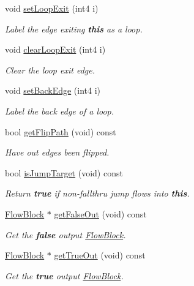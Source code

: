 \begin{DoxyCompactItemize}
void \mbox{\hyperlink{class_flow_block_a147b6b67590b45995925e08d6b77bd6e}{set\+Loop\+Exit}} (int4 i)
\begin{DoxyCompactList}\small\item\em Label the edge exiting {\bfseries{this}} as a loop. \end{DoxyCompactList}\item 
void \mbox{\hyperlink{class_flow_block_ac71babec977453975a79a1eda20babf2}{clear\+Loop\+Exit}} (int4 i)
\begin{DoxyCompactList}\small\item\em Clear the loop exit edge. \end{DoxyCompactList}\item 
void \mbox{\hyperlink{class_flow_block_a9a47416c1462a0fc5069afb8c7ed5b1c}{set\+Back\+Edge}} (int4 i)
\begin{DoxyCompactList}\small\item\em Label the {\itshape back} edge of a loop. \end{DoxyCompactList}\item 
bool \mbox{\hyperlink{class_flow_block_a7b9cd8f7c7ead109b98d92d56fab80a1}{get\+Flip\+Path}} (void) const
\begin{DoxyCompactList}\small\item\em Have out edges been flipped. \end{DoxyCompactList}\item 
bool \mbox{\hyperlink{class_flow_block_a9dd26ef25c281fc1c64a99ecd1c9eada}{is\+Jump\+Target}} (void) const
\begin{DoxyCompactList}\small\item\em Return {\bfseries{true}} if non-\/fallthru jump flows into {\bfseries{this}}. \end{DoxyCompactList}\item 
\mbox{\hyperlink{class_flow_block}{Flow\+Block}} $\ast$ \mbox{\hyperlink{class_flow_block_aadc5b837e1a1a2acc37f1f9cbcf04497}{get\+False\+Out}} (void) const
\begin{DoxyCompactList}\small\item\em Get the {\bfseries{false}} output \mbox{\hyperlink{class_flow_block}{Flow\+Block}}. \end{DoxyCompactList}\item 
\mbox{\hyperlink{class_flow_block}{Flow\+Block}} $\ast$ \mbox{\hyperlink{class_flow_block_aa4603393f63126506d0ea46e59b1b188}{get\+True\+Out}} (void) const
\begin{DoxyCompactList}\small\item\em Get the {\bfseries{true}} output \mbox{\hyperlink{class_flow_block}{Flow\+Block}}. \end{DoxyCompactList}\item 

\end{DoxyCompactItemize}
